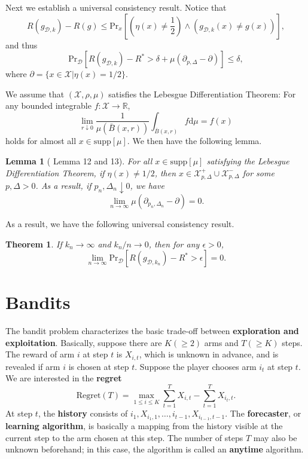 \documentclass[openany]{book}
\newtheorem{lemma}{Lemma}[chapter]
\newtheorem{theorem}{Theorem}[chapter]
\theoremstyle{definition}
\theoremstyle{remark}
\begin{document}
Next we establish a universal consistency result. Notice that
\begin{equation*}
    R(g_{\mathcal{D},k})-R(g)\le \mathrm{Pr}_x\left[\left(\eta(x)\ne \frac{1}{2}\right)\wedge(g_{\mathcal{D},k}(x)\ne g(x))\right],
\end{equation*}
and thus
\begin{equation*}
    \mathrm{Pr}_{\mathcal{D}}\left[R(g_{\mathcal{D},k})-R^*>\delta+\mu(\partial_{p,\Delta}\!-\partial)\right]\le\delta,
\end{equation*}
where $\partial=\{x\in \mathcal{X}|\eta(x)=1/2\}$.

We assume that $(\mathcal{X},\rho,\mu)$ satisfies the Lebesgue Differentiation Theorem: For any bounded integrable $f:\mathcal{X}\to \mathbb{R}$,
\begin{equation*}
    \lim_{r\downarrow0}\frac{1}{\mu(\bar{B}(x,r))}\int_{\bar{B}(x,r)}f \mathrm{d}\mu=f(x)
\end{equation*}
holds for almost all $x\in \mathrm{supp}[\mu]$. We then have the following lemma.
\begin{lemma}[\cite{CD14} Lemma 12 and 13]
    For all $x\in \mathrm{supp}[\mu]$ satisfying the Lebesgue Differentiation Theorem, if $\eta(x)\ne1/2$, then $x\in \mathcal{X}_{p,\Delta}^+\cup \mathcal{X}_{p,\Delta}^-$ for some $p,\Delta>0$. As a result, if $p_n,\Delta_n\downarrow0$, we have
    \begin{equation*}
        \lim_{n\to\infty}\mu(\partial_{p_n,\Delta_n}\!-\partial)=0.
    \end{equation*}
\end{lemma}
As a result, we have the following universal consistency result.
\begin{theorem}
    If $k_n\to\infty$ and $k_n/n\to0$, then for any $\epsilon>0$,
    \begin{equation*}
        \lim_{n\to\infty}\mathrm{Pr}_{\mathcal{D}}[R(g_{\mathcal{D},k_n})-R^*>\epsilon]=0.
    \end{equation*}
\end{theorem}

\part{Bandits}
The bandit problem characterizes the basic trade-off between \textbf{exploration and exploitation}. Basically, suppose there are $K(\ge2)$ arms and $T(\ge K)$ steps. The reward of arm $i$ at step $t$ is $X_{i,t}$, which is unknown in advance, and is revealed if arm $i$ is chosen at step $t$. Suppose the player chooses arm $i_t$ at step $t$. We are interested in the \textbf{regret}
\begin{equation}\label{regret}
    \mathrm{Regret}(T)=\max_{1\le i\le K}\sum_{t=1}^{T}X_{i,t}-\sum_{t=1}^{T}X_{i_t,t}.
\end{equation}
At step $t$, the \textbf{history} consists of $i_1,X_{i_1,1},\ldots,i_{t-1},X_{i_{t-1},t-1}$. The \textbf{forecaster}, or \textbf{learning algorithm}, is basically a mapping from the history visible at the current step to the arm chosen at this step. The number of steps $T$ may also be unknown beforehand; in this case, the algorithm is called an \textbf{anytime} algorithm.
\end{document}
